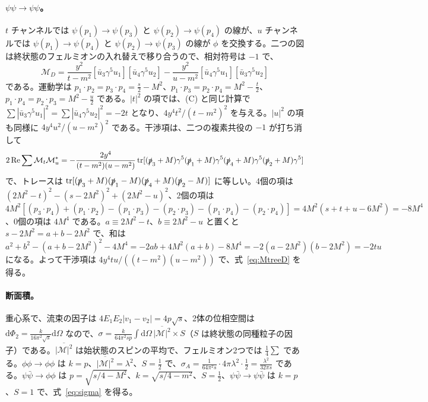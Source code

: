 \documentclass[a4paper,10pt]{ltjsarticle}
\newcommand{\dd}{\mathrm{d}}
\begin{document}
\paragraph{$\psi\psi\to\psi\psi$。}$t$ チャンネルでは $\psi(p_1)\to\psi(p_3)$ と $\psi(p_2)\to\psi(p_4)$ の線が、$u$ チャンネルでは $\psi(p_1)\to\psi(p_4)$ と $\psi(p_2)\to\psi(p_3)$ の線が $\phi$ を交換する。二つの図は終状態のフェルミオンの入れ替えで移り合うので、相対符号は $-1$ で、
\begin{equation*}
\mathcal M_D=\frac{y^2}{t-m^2}[\bar u_3\gamma^5u_1][\bar u_4\gamma^5u_2]-\frac{y^2}{u-m^2}[\bar u_4\gamma^5u_1][\bar u_3\gamma^5u_2]
\end{equation*}
である。運動学は $p_1\cdot p_2=p_3\cdot p_4=\frac s2-M^2$、$p_1\cdot p_3=p_2\cdot p_4=M^2-\frac t2$、$p_1\cdot p_4=p_2\cdot p_3=M^2-\frac u2$ である。$|t|^2$ の項では、(C) と同じ計算で $\sum|\bar u_3\gamma^5u_1|^2=\sum|\bar u_4\gamma^5u_2|^2=-2t$ となり、$4y^4t^2/(t-m^2)^2$ を与える。$|u|^2$ の項も同様に $4y^4u^2/(u-m^2)^2$ である。干渉項は、二つの複素共役の $-1$ が打ち消して
\begin{equation*}
2\,\mathrm{Re}\sum\mathcal M_t\mathcal M_u^*=-\frac{2y^4}{(t-m^2)(u-m^2)}\,\mathrm{tr}[(\slashed p_3+M)\gamma^5(\slashed p_1+M)\gamma^5(\slashed p_4+M)\gamma^5(\slashed p_2+M)\gamma^5]
\end{equation*}
で、トレースは $\mathrm{tr}[(\slashed p_3+M)(\slashed p_1-M)(\slashed p_4+M)(\slashed p_2-M)]$ に等しい。4個の項は $(2M^2-t)^2-(s-2M^2)^2+(2M^2-u)^2$、2個の項は $4M^2[(p_3\cdot p_4)+(p_1\cdot p_2)-(p_1\cdot p_3)-(p_2\cdot p_3)-(p_1\cdot p_4)-(p_2\cdot p_4)]=4M^2(s+t+u-6M^2)=-8M^4$、0個の項は $4M^4$ である。$a\equiv2M^2-t$、$b\equiv2M^2-u$ と置くと $s-2M^2=a+b-2M^2$ で、和は $a^2+b^2-(a+b-2M^2)^2-4M^4=-2ab+4M^2(a+b)-8M^4=-2(a-2M^2)(b-2M^2)=-2tu$ になる。よって干渉項は $4y^4tu/((t-m^2)(u-m^2))$ で、式~\eqref{eq:MtreeD} を得る。

\paragraph{断面積。}重心系で、流束の因子は $4E_1E_2|v_1-v_2|=4p\sqrt s$、2体の位相空間は $\dd\Phi_2=\frac{k}{16\pi^2\sqrt s}\dd\Omega$ なので、$\sigma=\frac{k}{64\pi^2sp}\int\dd\Omega\,\overline{|\mathcal M|^2}\times S$（$S$ は終状態の同種粒子の因子）である。$\overline{|\mathcal M|^2}$ は始状態のスピンの平均で、フェルミオン2つでは $\frac14\sum$ である。$\phi\phi\to\phi\phi$ は $k=p$、$\overline{|\mathcal M|^2}=\lambda^2$、$S=\frac12$ で、$\sigma_A=\frac{1}{64\pi^2s}\cdot4\pi\lambda^2\cdot\frac12=\frac{\lambda^2}{32\pi s}$ である。$\psi\bar\psi\to\phi\phi$ は $p=\sqrt{s/4-M^2}$、$k=\sqrt{s/4-m^2}$、$S=\frac12$、$\psi\bar\psi\to\psi\bar\psi$ は $k=p$、$S=1$ で、式~\eqref{eq:sigma} を得る。
\end{document}
